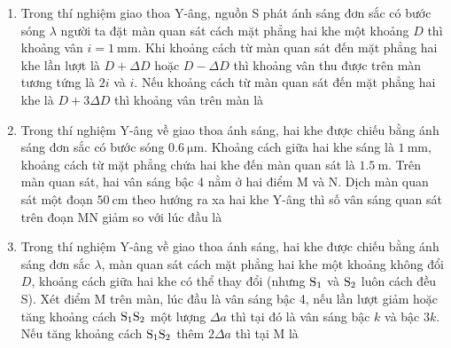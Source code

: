 \begin{enumerate}
{	}
	\item
	{
		Trong thí nghiệm giao thoa Y-âng, nguồn S phát ánh sáng đơn sắc có bước sóng $\lambda$ người ta đặt màn quan sát cách mặt phẳng hai khe một khoảng $D$ thì khoảng vân $i=\SI{1}{\milli \meter}$. Khi khoảng cách từ màn quan sát đến mặt phẳng hai khe lần lượt là $D+\Delta D$ hoặc $D-\Delta D$ thì khoảng vân thu được trên màn tương tứng là $2i$ và $i$. Nếu khoảng cách từ màn quan sát đến mặt phẳng hai khe là $D+3\Delta D$ thì khoảng vân trên màn là
	}
	\item
	{
		Trong thí nghiệm Y-âng về giao thoa ánh sáng, hai khe được chiếu bằng ánh sáng đơn sắc có bước sóng $\SI{0.6}{\micro \meter}$. Khoảng cách giữa hai khe sáng là $\SI{1}{\milli \meter}$, khoảng cách từ mặt phẳng chứa hai khe đến màn quan sát là $\SI{1.5}{\meter}$. Trên màn quan sát, hai vân sáng bậc 4 nằm ở hai điểm M và N. Dịch màn quan sát một đoạn $\SI{50}{\centi \meter}$ theo hướng ra xa hai khe Y-âng thì số vân sáng quan sát trên đoạn MN giảm so với lúc đầu là
	}
	\item
	{
		Trong thí nghiệm Y-âng về giao thoa ánh sáng, hai khe được chiếu bằng ánh sáng đơn sắc $\lambda$, màn quan sát cách mặt phẳng hai khe một khoảng không đổi $D$, khoảng cách giữa hai khe có thể thay đổi (nhưng $\text S_1$ và $\text S_2$ luôn cách đều S). Xét điểm M trên màn, lúc đầu là vân sáng bậc 4, nếu lần lượt giảm hoặc tăng khoảng cách $\text S_1 \text S_2$ một lượng $\Delta a$ thì tại đó là vân sáng bậc $k$ và bậc $3k$. Nếu tăng khoảng cách $\text S_1 \text S_2$ thêm $2\Delta a$ thì tại M là
	}
\end{enumerate}
